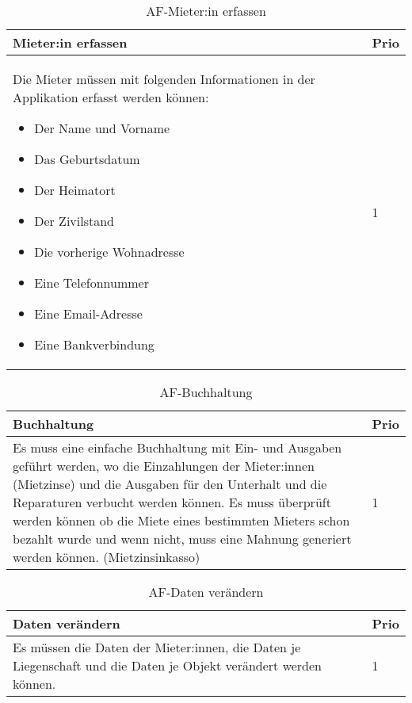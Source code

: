 \begin{table}[H]
  \centering
  \settowidth{}
  \setlength\extrarowheight{2pt}
  \begin{tabulary}{1.0\textwidth}{|m{16cm}|L|}
    \hline
    \textbf{Mieter:in erfassen}&\textbf{Prio}\\
    \hline
    Die Mieter müssen mit folgenden Informationen in der Applikation erfasst werden können:
    \begin{itemize}
      \item Der Name und Vorname
      \item Das Geburtsdatum
      \item Der Heimatort
      \item Der Zivilstand
      \item Die vorherige Wohnadresse
      \item Eine Telefonnummer
      \item Eine Email-Adresse
      \item Eine Bankverbindung
    \end{itemize} & 1\\
    \hline
  \end{tabulary}
  \caption{AF-Mieter:in erfassen}
  \label{afMieterinerfassen}
\end{table}

\begin{table}[H]
  \centering
  \settowidth{}
  \setlength\extrarowheight{2pt}
  \begin{tabulary}{1.0\textwidth}{|m{16cm}|L|}
    \hline
    \textbf{Buchhaltung}&\textbf{Prio}\\
    \hline
      Es muss eine einfache Buchhaltung mit Ein- und Ausgaben geführt werden, wo die Einzahlungen der Mieter:innen (Mietzinse) und die Ausgaben für den Unterhalt und die Reparaturen verbucht werden können. Es muss überprüft werden können ob die Miete eines bestimmten Mieters schon bezahlt wurde und wenn nicht, muss eine Mahnung generiert werden können. (Mietzinsinkasso)& 1\\
    \hline
  \end{tabulary}
  \caption{AF-Buchhaltung}
  \label{afBuchhaltung}
\end{table}

\begin{table}[H]
  \centering
  \settowidth{}
  \setlength\extrarowheight{2pt}
  \begin{tabulary}{1.0\textwidth}{|m{16cm}|L|}
    \hline
    \textbf{Daten verändern}&\textbf{Prio}\\
    \hline
    Es müssen die Daten der Mieter:innen, die Daten je Liegenschaft und die Daten je Objekt verändert werden können. & 1\\
    \hline
  \end{tabulary}
  \caption{AF-Daten verändern}
  \label{afDatenVeraendern}
\end{table}

